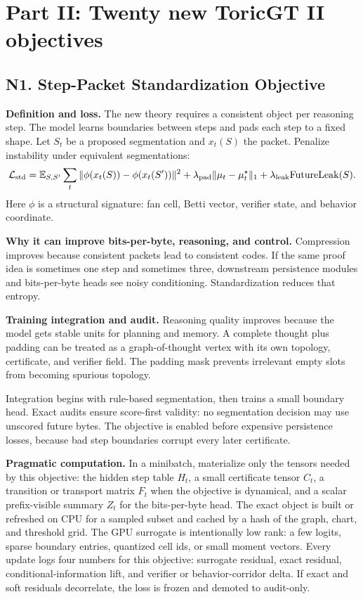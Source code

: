 \documentclass[10pt]{article}
\newcommand{\loss}{\mathcal{L}}
\numberwithin{equation}{section}
\begin{document}
\section{Part II: Twenty new ToricGT II objectives}
\clearpage
\subsection{N1. Step-Packet Standardization Objective}
\noindent\textbf{Definition and loss.} The new theory requires a consistent object per reasoning step. The model learns boundaries between steps and pads each step to a fixed shape. Let $S_t$ be a proposed segmentation and $x_t(S)$ the packet. Penalize instability under equivalent segmentations:
\[
\loss_{\rm std}=\mathbb E_{S,S'}\sum_t\|\phi(x_t(S))-\phi(x_t(S'))\|^2+\lambda_{\rm pad}\|\mu_t-\mu_t^\star\|_1+\lambda_{\rm leak}\mathrm{FutureLeak}(S).
\]
Here $\phi$ is a structural signature: fan cell, Betti vector, verifier state, and behavior coordinate.

\noindent\textbf{Why it can improve bits-per-byte, reasoning, and control.} Compression improves because consistent packets lead to consistent codes. If the same proof idea is sometimes one step and sometimes three, downstream persistence modules and bits-per-byte heads see noisy conditioning. Standardization reduces that entropy.

\noindent\textbf{Training integration and audit.} Reasoning quality improves because the model gets stable units for planning and memory. A complete thought plus padding can be treated as a graph-of-thought vertex with its own topology, certificate, and verifier field. The padding mask prevents irrelevant empty slots from becoming spurious topology.

Integration begins with rule-based segmentation, then trains a small boundary head. Exact audits ensure score-first validity: no segmentation decision may use unscored future bytes. The objective is enabled before expensive persistence losses, because bad step boundaries corrupt every later certificate.

\noindent\textbf{Pragmatic computation.} In a minibatch, materialize only the tensors needed by this objective: the hidden step table $H_t$, a small certificate tensor $C_t$, a transition or transport matrix $F_t$ when the objective is dynamical, and a scalar prefix-visible summary $Z_t$ for the bits-per-byte head. The exact object is built or refreshed on CPU for a sampled subset and cached by a hash of the graph, chart, and threshold grid. The GPU surrogate is intentionally low rank: a few logits, sparse boundary entries, quantized cell ids, or small moment vectors. Every update logs four numbers for this objective: surrogate residual, exact residual, conditional-information lift, and verifier or behavior-corridor delta. If exact and soft residuals decorrelate, the loss is frozen and demoted to audit-only.
\end{document}
